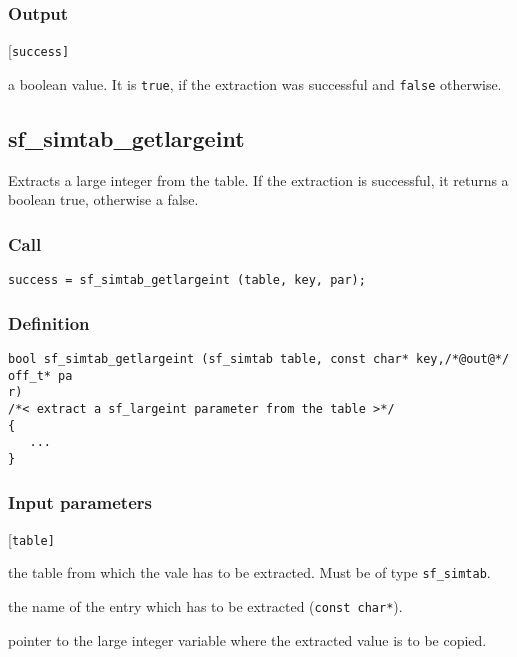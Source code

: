 \subsubsection*{Output}
\begin{desclist}{\tt }{\quad}[\tt success]
   \setlength\itemsep{0pt}
   \item[success] a boolean value. It is \texttt{true}, if the extraction was successful and \texttt{false} otherwise.
\end{desclist}




\subsection{{sf\_simtab\_getlargeint}}\label{sec:sf_simtab_getlargeint}
Extracts a large integer from the table. If the extraction is successful, it returns a boolean true, otherwise a false. 

\subsubsection*{Call}
\begin{verbatim}success = sf_simtab_getlargeint (table, key, par);\end{verbatim}

\subsubsection*{Definition}
\begin{verbatim}
bool sf_simtab_getlargeint (sf_simtab table, const char* key,/*@out@*/ off_t* pa
r)
/*< extract a sf_largeint parameter from the table >*/
{
   ...
}
\end{verbatim}

\subsubsection*{Input parameters}
\begin{desclist}{\tt }{\quad}[\tt table]
   \setlength\itemsep{0pt}
   \item[table] the table from which the vale has to be extracted. Must be of type \texttt{sf\_simtab}.
   \item[key]   the name of the entry which has to be extracted (\texttt{const char*}).
   \item[par]   pointer to the large integer variable where the extracted value is to be copied.
\end{desclist}

